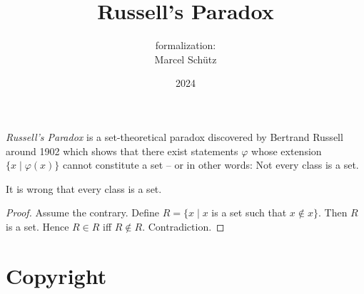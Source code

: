 \documentclass{article}
\title{Russell's Paradox}
\author{\Naproche formalization:\\[0.5em]Marcel Schütz}
\date{2024}
\begin{document}
  \maketitle

  \noindent \emph{Russell's Paradox} is a set-theoretical paradox discovered by
  Bertrand Russell around 1902 \cite[chapter XV]{Frege1980} which shows that 
  there exist statements $\varphi$ whose extension
  $\{x\mid\varphi(x)\}$ cannot constitute a set -- or in other words:
  Not every class is a set.

  \begin{forthel}
    \begin{theorem*}[title=Russell's Paradox,id=russell_paradox]
      It is wrong that every class is a set.
    \end{theorem*}
    \begin{proof}
      Assume the contrary.
      Define $R = \{x \mid x$ is a set such that $x \notin x\}$.
      Then $R$ is a set.
      Hence $R \in R$ iff $R \notin R$.
      Contradiction.
    \end{proof}
  \end{forthel}

  \printbibliography

  \section*{Copyright}
  \doclicenseThis
\end{document}
